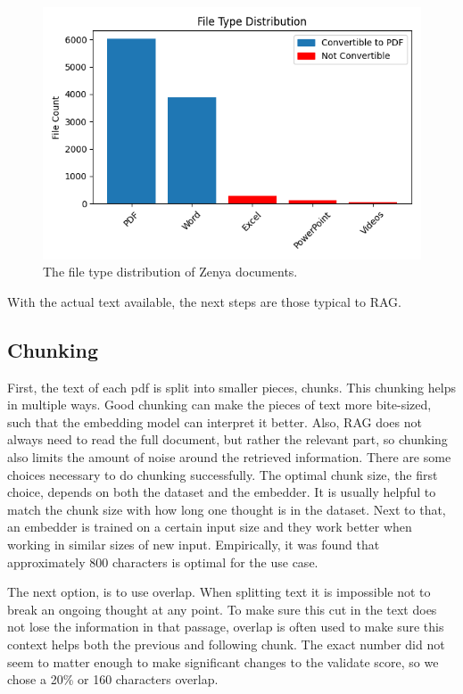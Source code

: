 \begin{figure}[H]
    \captionsetup{justification=centering}
    \centerline{\includegraphics[width=0.7\linewidth]{fig/file_type_distribution.png}}
    \caption{The file type distribution of Zenya documents.}
    \label{fig:file_type_distribution}
\end{figure}

With the actual text available, the next steps are those typical to RAG. 

\subsection{Chunking}
First, the text of each pdf is split into smaller pieces, chunks. This chunking helps in multiple ways. Good chunking can make the pieces of text more bite-sized, such that the embedding model can interpret it better. Also, RAG does not always need to read the full document, but rather the relevant part, so chunking also limits the amount of noise around the retrieved information. There are some choices necessary to do chunking successfully. The optimal chunk size, the first choice, depends on both the dataset and the embedder. It is usually helpful to match the chunk size with how long one thought is in the dataset. Next to that, an embedder is trained on a certain input size and they work better when working in similar sizes of new input. Empirically, it was found that approximately 800 characters is optimal for the use case. 

The next option, is to use overlap. When splitting text it is impossible not to break an ongoing thought at any point. To make sure this cut in the text does not lose the information in that passage, overlap is often used to make sure this context helps both the previous and following chunk. The exact number did not seem to matter enough to make significant changes to the validate score, so we chose a 20\% or 160 characters overlap.

